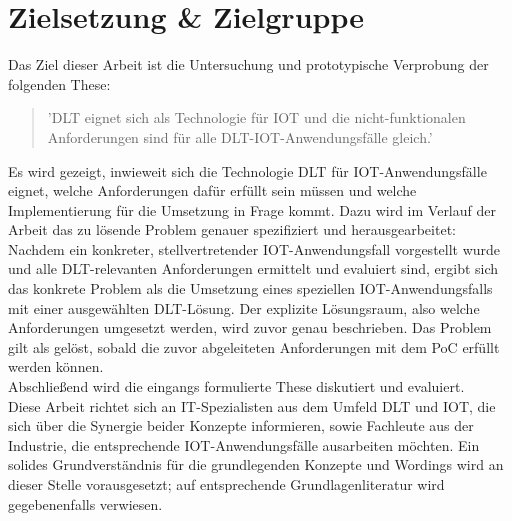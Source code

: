\section{Zielsetzung \& Zielgruppe}
\label{sec:intro:goal}
Das Ziel dieser Arbeit ist die Untersuchung und prototypische Verprobung der folgenden These:
\begin{quote}
  '\ac{DLT} eignet sich als Technologie für \ac{IOT} und die nicht-funktionalen Anforderungen sind für alle \ac{DLT}-\ac{IOT}-Anwendungsfälle gleich.'
\end{quote}
Es wird gezeigt, inwieweit sich die Technologie \ac{DLT} für \ac{IOT}-Anwendungsfälle eignet, welche Anforderungen dafür erfüllt sein müssen und welche Implementierung für die Umsetzung in Frage kommt. Dazu wird im Verlauf der Arbeit das zu lösende Problem genauer spezifiziert und herausgearbeitet: Nachdem ein konkreter, stellvertretender \ac{IOT}-Anwendungsfall vorgestellt wurde und alle \ac{DLT}-relevanten Anforderungen ermittelt und evaluiert sind, ergibt sich das konkrete Problem als die Umsetzung eines speziellen \ac{IOT}-Anwendungsfalls mit einer ausgewählten \ac{DLT}-Lösung. Der explizite Lösungsraum, also welche Anforderungen umgesetzt werden, wird zuvor genau beschrieben. Das Problem gilt als gelöst, sobald die zuvor abgeleiteten Anforderungen mit dem \ac{PoC} erfüllt werden können.\\
Abschließend wird die eingangs formulierte These diskutiert und evaluiert.\\
Diese Arbeit richtet sich an IT-Spezialisten aus dem Umfeld \ac{DLT} und \ac{IOT}, die sich über die Synergie beider Konzepte informieren, sowie Fachleute aus der Industrie, die entsprechende \ac{IOT}-Anwendungsfälle ausarbeiten möchten. Ein solides Grundverständnis für die grundlegenden Konzepte und Wordings wird an dieser Stelle vorausgesetzt; auf entsprechende Grundlagenliteratur wird gegebenenfalls verwiesen.

%
%
